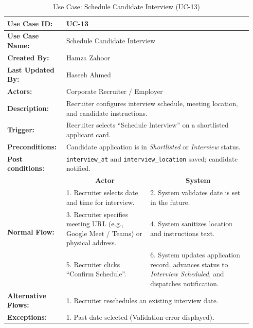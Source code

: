 \begin{table}[H]
\centering
\small
\caption{Use Case: Schedule Candidate Interview (UC-13)}
\label{tab:uc13_spec}
\begin{tabular}{|p{3.2cm}|p{5.5cm}|p{5.5cm}|}
\hline
\textbf{Use Case ID:} & \multicolumn{2}{p{11.4cm}|}{UC-13} \\ \hline
\textbf{Use Case Name:} & \multicolumn{2}{p{11.4cm}|}{Schedule Candidate Interview} \\ \hline
\textbf{Created By:} & \multicolumn{2}{p{11.4cm}|}{Hamza Zahoor} \\ \hline
\textbf{Last Updated By:} & \multicolumn{2}{p{11.4cm}|}{Haseeb Ahmed} \\ \hline
\textbf{Actors:} & \multicolumn{2}{p{11.4cm}|}{Corporate Recruiter / Employer} \\ \hline
\textbf{Description:} & \multicolumn{2}{p{11.4cm}|}{Recruiter configures interview schedule, meeting location, and candidate instructions.} \\ \hline
\textbf{Trigger:} & \multicolumn{2}{p{11.4cm}|}{Recruiter selects ``Schedule Interview'' on a shortlisted applicant card.} \\ \hline
\textbf{Preconditions:} & \multicolumn{2}{p{11.4cm}|}{Candidate application is in \textit{Shortlisted} or \textit{Interview} status.} \\ \hline
\textbf{Post conditions:} & \multicolumn{2}{p{11.4cm}|}{\texttt{interview\_at} and \texttt{interview\_location} saved; candidate notified.} \\ \hline
\multirow{4}{*}{\textbf{Normal Flow:}} & \multicolumn{1}{c|}{\textbf{Actor}} & \multicolumn{1}{c|}{\textbf{System}} \\ \cline{2-3}
& 1. Recruiter selects date and time for interview. & 2. System validates date is set in the future. \vspace{2pt} \\
& 3. Recruiter specifies meeting URL (e.g., Google Meet / Teams) or physical address. & 4. System sanitizes location and instructions text. \vspace{2pt} \\
& 5. Recruiter clicks ``Confirm Schedule''. & 6. System updates application record, advances status to \textit{Interview Scheduled}, and dispatches notification. \\ \hline
\textbf{Alternative Flows:} & \multicolumn{2}{p{11.4cm}|}{1. Recruiter reschedules an existing interview date.} \\ \hline
\textbf{Exceptions:} & \multicolumn{2}{p{11.4cm}|}{1. Past date selected (Validation error displayed).} \\ \hline
\end{tabular}
\end{table}

